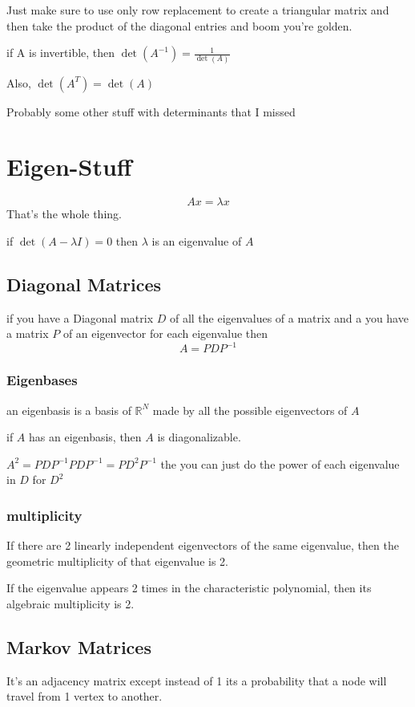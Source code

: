 \documentclass[fleqn]{report}
\begin{document}
Just make sure to use only row replacement to create a triangular matrix and then take the product of the diagonal entries and boom you're golden. 

if A is invertible, then $\det(A^{-1}) = \frac{1}{\det(A)}$

Also, $\det(A^T) = \det(A)$

Probably some other stuff with determinants that I missed

\chapter{Eigen-Stuff}
\[
Ax = \lambda x
\]
That's the whole thing. 

if $\det(A - \lambda I) = 0$ then $\lambda$ is an eigenvalue of $A$

\section{Diagonal Matrices}
if you have a Diagonal matrix $D$ of all the eigenvalues of a matrix and a you have a matrix $P$ of an eigenvector for each eigenvalue then 
\[
A = P D P^{-1}
\]

\subsection{Eigenbases}
an eigenbasis is a basis of $\mathbb{R}^N$ made by all the possible eigenvectors of $A$

if $A$ has an eigenbasis, then $A$ is diagonalizable. \

$A^2 = P D P^{-1} P D P^{-1} = P D^2 P^{-1}$ the you can just do the power of each 
eigenvalue in $D$ for $D^2$

\subsection{multiplicity}
If there are 2 linearly independent eigenvectors of the same eigenvalue, then the geometric multiplicity of that eigenvalue is 2. 

If the eigenvalue appears 2 times in the characteristic polynomial, then its 
algebraic multiplicity is 2.

\section{Markov Matrices}
It's an adjacency matrix except instead of 1 its a probability that 
a node will travel from 1 vertex to another. 
\end{document}

